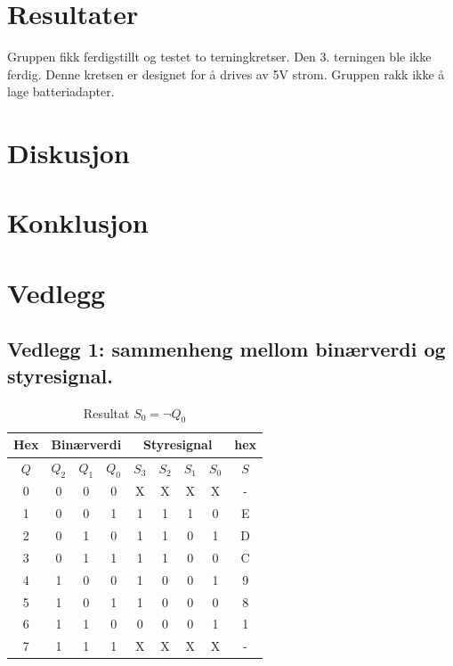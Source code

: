 \documentclass[12pt,norsk,a4paper]{article}
\begin{document}
\section{Resultater}
Gruppen fikk ferdigstillt og testet to terningkretser. Den 3. terningen ble ikke ferdig.
Denne kretsen er designet for å drives av 5V strom. Gruppen rakk ikke å lage batteriadapter.

\clearpage

\section{Diskusjon}
\clearpage

\section{Konklusjon}
\clearpage

\section{Vedlegg}
    \subsection{Vedlegg 1: sammenheng mellom binærverdi og styresignal.}
    \begin{table}[H]
    \begin{center}
    \begin{tabular}{|c|c|c|c|c|c|c|c|c|}
    \hline
    Hex & \multicolumn{3}{|c|}{Binærverdi} & \multicolumn{4}{|c|}{Styresignal}&hex \\ \hline
    $Q$ & $Q_2$ & $Q_1$ & $Q_0$ & $S_3$ & $S_2$ & $S_1$ & $S_0$ & $S$ \\ \hline
    0 & 0 & 0 & 0 & X & X & X & X & - \\ \hline 
    1 & 0 & 0 & 1 & 1 & 1 & 1 & 0 & E \\ \hline
    2 & 0 & 1 & 0 & 1 & 1 & 0 & 1 & D \\ \hline
    3 & 0 & 1 & 1 & 1 & 1 & 0 & 0 & C \\ \hline
    4 & 1 & 0 & 0 & 1 & 0 & 0 & 1 & 9 \\ \hline
    5 & 1 & 0 & 1 & 1 & 0 & 0 & 0 & 8 \\ \hline
    6 & 1 & 1 & 0 & 0 & 0 & 0 & 1 & 1 \\ \hline
    7 & 1 & 1 & 1 & X & X & X & X & - \\ \hline
    \end{tabular}
    \end{center}
    \caption{Resultat $S_0=\neg Q_0$}
    \end{table}
    \clearpage
\end{document}
